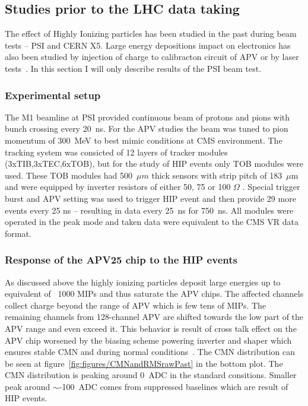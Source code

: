 \subsection{Studies prior to the LHC data taking~\label{sec:HIPinPast}}

The effect of Highly Ionizing particles has been studied in the past during beam tests -- PSI and CERN X5. Large energy depositions impact on electronics has also been studied by injection of charge to calibracton circuit of APV or by laser tests~\cite{Adam:2005pz}. In this section I will only describe results of the PSI beam test.

\subsubsection{Experimental setup}

The M1 beamline at PSI provided continuous beam of protons and pions with bunch crossing every 20~ns. For the APV studies the beam was tuned to pion momentum of 300~MeV to best mimic conditions at CMS environment. The tracking system was consicted of 12 layers of tracker modules (3xTIB,3xTEC,6xTOB), but for the study of HIP events only TOB modules were used. These TOB modules had 500~$\mu m$ thick sensors with strip pitch of 183~$\mu$m and were equipped by inverter resistors of either 50, 75 or 100 $\Omega$ . Special trigger burst and APV setting was used to trigger HIP event and then provide 29 more events every 25 ns -- resulting in data every 25~ns for 750~ns. All modules were operated in the peak mode and taken data were equivalent to the CMS VR data format. 




\subsubsection{Response of the APV25 chip to the HIP events}

As discussed above the highly ionizing particles deposit large energies up to equivalent of ~1000 MIPs and thus saturate the APV chips. The affected channels collect charge beyond the range of APV which is few tens of MIPs. The remaining channels from 128-channel APV are shifted towards the low part of the APV range and even exceed it. This behavior is result of cross talk effect on the APV chip worsened by the biasing scheme powering inverter and shaper which ensures stable CMN and during normal conditions~\cite{Bainbridge:2004jc}. The CMN distribution can be seen at figure~\ref{fig:figures/CMNandRMSrawPast} in the bottom plot. The CMN distribution is peaking around 0~ADC in the standard consitions. Smaller peak around $\sim$-100~ADC comes from suppressed baselines which are result of HIP events. 

